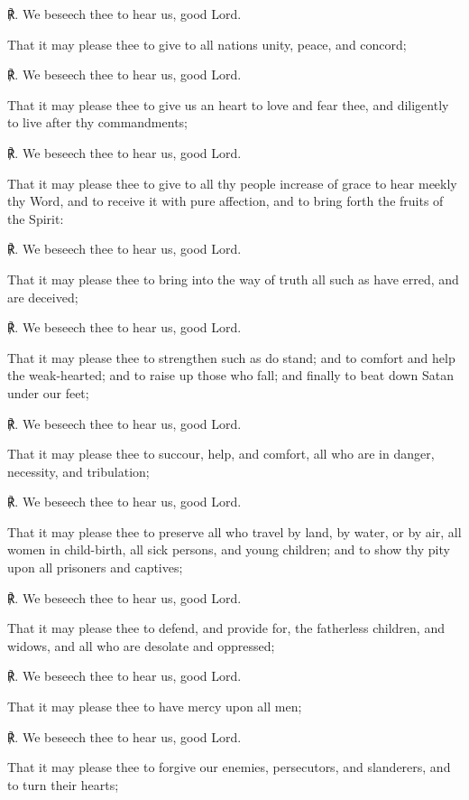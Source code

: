     ℟. We beseech thee to hear us, good Lord.
    \par\noindent
    That it may please thee to give to all nations unity, peace, and concord;
    
    ℟. We beseech thee to hear us, good Lord.
    \par\noindent
    That it may please thee to give us an heart to love and fear thee, and diligently to live after thy commandments;
    
    ℟. We beseech thee to hear us, good Lord.
    \par\noindent
    That it may please thee to give to all thy people increase of grace to hear meekly thy Word, and to receive it with pure affection, and to bring forth the fruits of the Spirit:
    
    ℟. We beseech thee to hear us, good Lord.
    \par\noindent
    That it may please thee to bring into the way of truth all such as have erred, and are deceived;
    
    ℟. We beseech thee to hear us, good Lord.
    \par\noindent
    That it may please thee to strengthen such as do stand; and to comfort and help the weak-hearted; and to raise up those who fall; and finally to beat down Satan under our feet;
    
    ℟. We beseech thee to hear us, good Lord.
    \par\noindent
    That it may please thee to succour, help, and comfort, all who are in danger, necessity, and tribulation;
    
    ℟. We beseech thee to hear us, good Lord.
    \par\noindent
    That it may please thee to preserve all who travel by land, by water, or by air, all women in child-birth, all sick persons, and young children; and to show thy pity upon all prisoners and captives;

    ℟. We beseech thee to hear us, good Lord.
    \par\noindent
    That it may please thee to defend, and provide for, the fatherless children, and widows, and all who are desolate and oppressed;
    
    ℟. We beseech thee to hear us, good Lord.
    \par\noindent
    That it may please thee to have mercy upon all men;
    
    ℟. We beseech thee to hear us, good Lord.
    \par\noindent
    That it may please thee to forgive our enemies, persecutors, and slanderers, and to turn their hearts;
    
